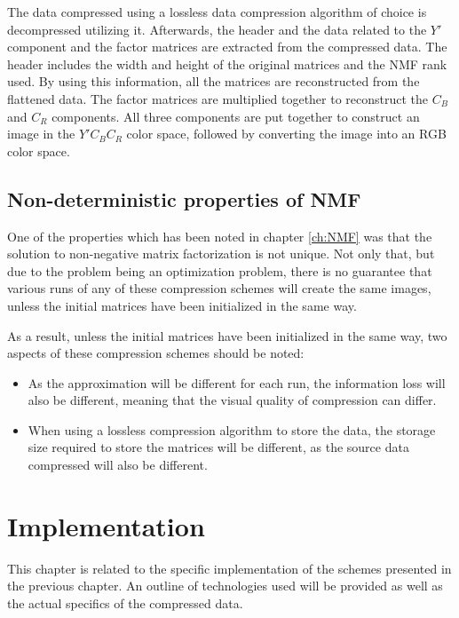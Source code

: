 \documentclass[thesis=M,english]{FITthesis}[2012/10/20]
\begin{document}
The data compressed using a lossless data compression algorithm of choice is decompressed
utilizing it. Afterwards, the header and the data related to the $Y'$ component and the factor matrices
are extracted from the compressed data. The header includes the width and height of the
original matrices and the NMF rank used. By using this information, all the matrices
are reconstructed from the flattened data. The factor matrices are multiplied together
to reconstruct the $C_B$ and $C_R$ components. All three components are put together
to construct an image in the $Y'C_BC_R$ color space, followed by converting the
image into an RGB color space.


\section{Non-deterministic properties of NMF}
One of the properties which has been noted in chapter \ref{ch:NMF} was that
the solution to non-negative matrix factorization is not unique. Not only that,
but due to the problem being an optimization problem, there is no guarantee that
various runs of any of these compression schemes will create the same images, unless
the initial matrices have been initialized in the same way.

As a result, unless the initial matrices have been initialized in the same way,
two aspects of these compression schemes should be noted:
\begin{itemize}
  \item As the approximation will be different for each run, the information loss will
  also be different, meaning that the visual quality of compression can differ.
  \item When using a lossless compression algorithm to store the data, the storage size required
  to store the matrices will be different, as the source data compressed will also
  be different.
\end{itemize}


\chapter{Implementation}
\label{ch:implementation}
This chapter is related to the specific implementation of the schemes presented in the
previous chapter. An outline of technologies used will be provided as well as the actual
specifics of the compressed data.
\end{document}
